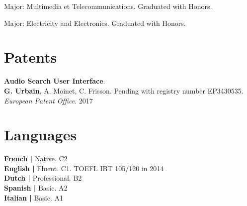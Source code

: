 \documentclass[a4paper]{deedy-resume} %
\begin{document}
{
\vspace{2pt}
Major: Multimedia et Telecommunications. Graduated with Honors.

\vspace{3pt}
Major: Electricity and Electronics. Graduated with Honors.

\pagebreak
\vspace*{0.1pt}

\begin{minipage}[b]{0.55\linewidth}
	
	
	\section{Patents}
	
	\vspace{5pt}
	\textbf{Audio Search User Interface}.\\
	\textbf{G. Urbain}, A. Moinet, C. Frisson. Pending with registry number EP3430535. \textit{European Patent Office}. 2017
	
	\vspace{18pt}
	
\end{minipage}
\hfill
\begin{minipage}[b]{0.42\linewidth}
	
	
	\section{Languages}
	\vspace{5pt}
	\noindent
	\textbf{French  \hspace{7.2pt} | \hspace{2pt}} Native. C2\\
	\textbf{English   \hspace{8.3pt}| \hspace{2pt}}  Fluent. C1. TOEFL IBT 105/120 in 2014\\
	\textbf{Dutch  \hspace{10.6pt} | \hspace{2pt}}  Professional. B2\\
	\textbf{Spanish  \hspace{3.7pt} | \hspace{2pt}} Basic. A2\\
	\textbf{Italian  \hspace{10.1pt} | \hspace{2pt}}  Basic. A1
	

\end{minipage}}
\end{document}
